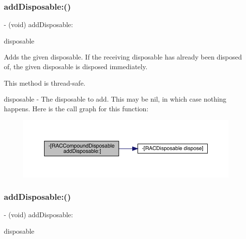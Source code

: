 \subsubsection{\texorpdfstring{add\+Disposable\+:()}{addDisposable:()}\hspace{0.1cm}{\footnotesize\ttfamily [2/3]}}
{\footnotesize\ttfamily -\/ (void) add\+Disposable\+: \begin{DoxyParamCaption}\item[{(\mbox{\hyperlink{interface_r_a_c_disposable}{R\+A\+C\+Disposable}} $\ast$)}]{disposable }\end{DoxyParamCaption}}

Adds the given disposable. If the receiving disposable has already been disposed of, the given disposable is disposed immediately.

This method is thread-\/safe.

disposable -\/ The disposable to add. This may be nil, in which case nothing happens. Here is the call graph for this function\+:\nopagebreak
\begin{figure}[H]
\begin{center}
\leavevmode
\includegraphics[width=350pt]{interface_r_a_c_compound_disposable_adfa5cef74d293abc13c6137289e6f908_cgraph}
\end{center}
\end{figure}
\mbox{\label{interface_r_a_c_compound_disposable_adfa5cef74d293abc13c6137289e6f908}} 
\subsubsection{\texorpdfstring{add\+Disposable\+:()}{addDisposable:()}\hspace{0.1cm}{\footnotesize\ttfamily [3/3]}}
{\footnotesize\ttfamily -\/ (void) add\+Disposable\+: \begin{DoxyParamCaption}\item[{(\mbox{\hyperlink{interface_r_a_c_disposable}{R\+A\+C\+Disposable}} $\ast$)}]{disposable }\end{DoxyParamCaption}}

